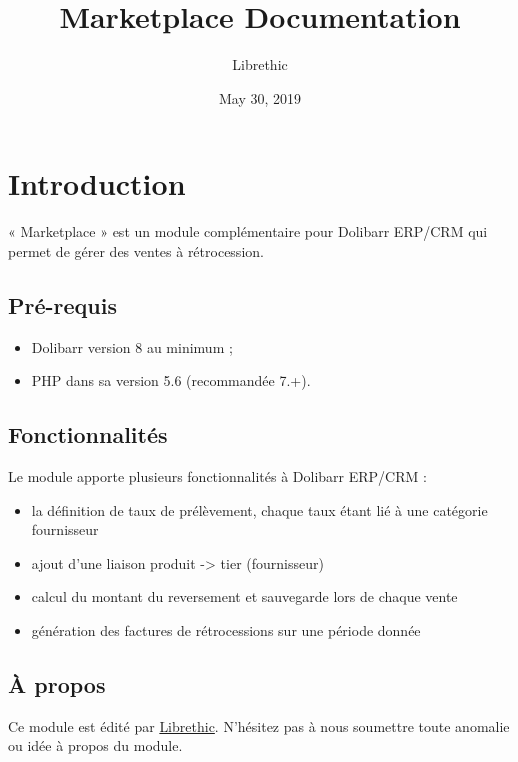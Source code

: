 \documentclass[letterpaper,10pt,english]{sphinxmanual}
\title{Marketplace Documentation}
\date{May 30, 2019}
\author{Librethic}
\begin{document}
\maketitle
\sphinxtableofcontents
{}\label{\detokenize{index::doc}}



\chapter{Introduction}
\label{\detokenize{intro:introduction}}\label{\detokenize{intro::doc}}\label{\detokenize{intro:welcome-to-marketplace-s-documentation}}
« Marketplace » est un module complémentaire pour Dolibarr ERP/CRM qui permet de gérer des ventes à rétrocession.


\section{Pré-requis}
\label{\detokenize{intro:pre-requis}}\begin{itemize}
\item {} 
Dolibarr version 8 au minimum ;

\item {} 
PHP dans sa version 5.6 (recommandée 7.+).

\end{itemize}
\href{https://dolistore.com}{}

\section{Fonctionnalités}
\label{\detokenize{intro:fonctionnalites}}
Le module apporte plusieurs fonctionnalités à Dolibarr ERP/CRM :
\begin{itemize}
\item {} 
la définition de taux de prélèvement, chaque taux étant lié à une catégorie fournisseur

\item {} 
ajout d'une liaison produit -\textgreater{} tier (fournisseur)

\item {} 
calcul du montant du reversement et sauvegarde lors de chaque vente

\item {} 
génération des factures de rétrocessions sur une période donnée

\end{itemize}


\section{À propos}
\label{\detokenize{intro:a-propos}}
Ce module est édité par \href{https://librethic.io/}{Librethic}. N'hésitez pas à nous soumettre toute anomalie ou idée à propos du module.
\end{document}
